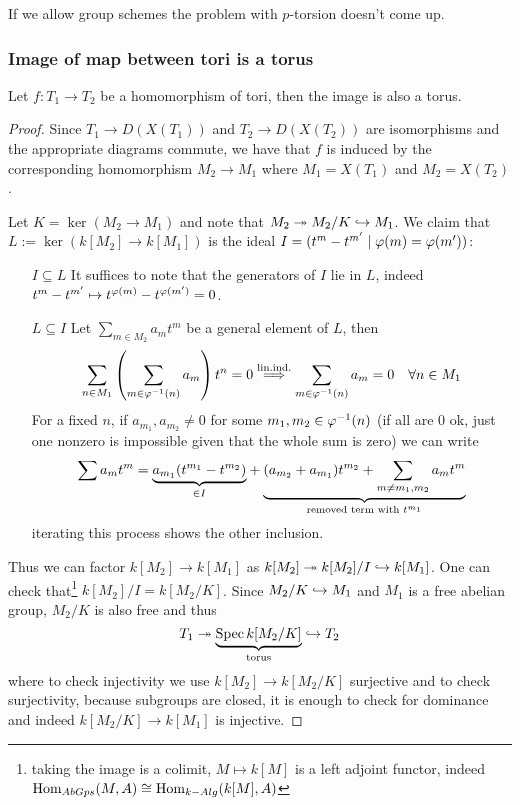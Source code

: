 \begin{remark}
If we allow group schemes the problem with $p$-torsion doesn't come up.
\end{remark}













\subsubsection{Image of map between tori is a torus}

\begin{proposition}\label{PrImageOfTorusInATorusIsATorus}
Let $f:T_1\to T_2$ be a homomorphism of tori, then the image is also a torus.
\end{proposition}
\begin{proof}
Since $T_1\to D(X(T_1))$ and $T_2\to D(X(T_2))$ are isomorphisms and the appropriate diagrams commute, we have that $f$ is induced by the corresponding homomorphism $M_2\to M_1$ where $M_1=X(T_1)$ and $M_2=X(T_2)$.

Let $K=\ker(M_2\to M_1)$ and note that $M_2\twoheadrightarrow M_2/K\hookrightarrow M_1$. We claim that $L:=\ker(k[M_2]\to k[M_1])$ is the ideal $I=(t^m-t^{m'}\mid \varphi(m)=\varphi(m'))$:
\setlength{\leftmargini}{0cm}
\begin{itemize}
\item[$\boxed{I\subseteq L}$] It suffices to note that the generators of $I$ lie in $L$, indeed $t^m-t^{m'}\mapsto t^{\varphi(m)}-t^{\varphi(m')}=0$.
\item[$\boxed{L\subseteq I}$] Let $\sum_{m\in M_2}a_mt^m$ be a general element of $L$, then
\[\sum_{n\in M_1}\left({\sum_{m\in \varphi^{-1}(n)}a_m}\right)t^n=0\overset{\text{lin.ind.}}\Longrightarrow \sum_{m\in \varphi^{-1}(n)}a_m=0\quad \forall n\in M_1\]
For a fixed $n$, if $a_{m_1},a_{m_2}\neq 0$ for some $m_1,m_2\in \varphi^{-1}(n)$ (if all are $0$ ok, just one nonzero is impossible given that the whole sum is zero) we can write
\[\sum a_m t^m=\underset{\in I}{\underbrace{a_{m_1}(t^{m_1}-t^{m_2})}}+\underset{\text{removed term with }t^{m_1}}{\underbrace{(a_{m_2}+a_{m_1})t^{m_2}+\sum_{m\neq m_1,m_2}a_mt^m}}\]
iterating this process shows the other inclusion.
\end{itemize}
\setlength{\leftmargini}{0.5cm}
Thus we can factor $k[M_2]\to k[M_1]$ as $k[M_2]\twoheadrightarrow k[M_2]/I\hookrightarrow k[M_1]$. One can check that\footnote{taking the image is a colimit, $M\mapsto k[M]$ is a left adjoint functor, indeed $\operatorname{Hom}_{AbGps}(M,A)\cong \operatorname{Hom}_{k-Alg}(k[M],A)$} $k[M_2]/I=k[M_2/K]$. Since $M_2/K\hookrightarrow M_1$ and $M_1$ is a free abelian group, $M_2/K$ is also free and thus
\[T_1\twoheadrightarrow \underset{\text{torus}}{\underbrace{\operatorname{Spec} k[M_2/K]}}\hookrightarrow T_2\]
where to check injectivity we use $k[M_2]\to k[M_2/K]$ surjective and to check surjectivity, because subgroups are closed, it is enough to check for dominance and indeed $k[M_2/K]\to k[M_1]$ is injective.
\end{proof}

